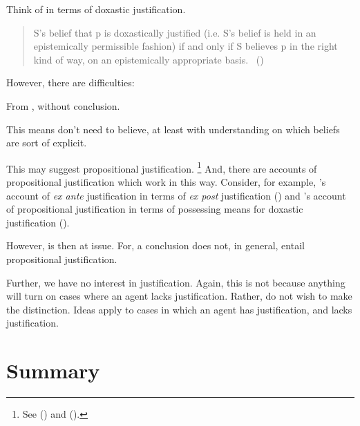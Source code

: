 \begin{note}
  Think of \ros{} in terms of doxastic justification.

  \begin{quote}
    S's belief that p is doxastically justified (i.e. S's belief is held in an epistemically permissible fashion) if and only if S believes p in the right kind of way, on an epistemically appropriate basis.%
    \mbox{ }\hfill\mbox{(\citeyear{Bondy:2018tk})}
  \end{quote}

  However, there are difficulties:

  From \supportII{}, \ros{} without conclusion.

  This means don't need to believe, at least with understanding on which beliefs are sort of explicit.

  This may suggest propositional justification.%
  \footnote{
    See (\cite{Firth:1978vi}) and (\cite[esp.\ fn.1]{Silva:2020aa}).
  }
  And, there are accounts of propositional justification which work in this way.
  Consider, for example, \citeauthor{Goldman:1979ui}'s account of \emph{ex ante} justification in terms of \emph{ex post} justification (\citeyear[351--352]{Goldman:1979ui}) and \citeauthor{Turri:2010aa}'s account of propositional justification in terms of possessing means for doxastic justification (\citeyear[320]{Turri:2010aa}).

  However, \supportI{} is then at issue.
  For, a conclusion does not, in general, entail propositional justification.
\end{note}

\begin{note}
  Further, we have no interest in justification.
  Again, this is not because anything will turn on cases where an agent lacks justification.
  Rather, do not wish to make the distinction.
  Ideas apply to cases in which an agent has justification, and lacks justification.
\end{note}



\section*{Summary}



